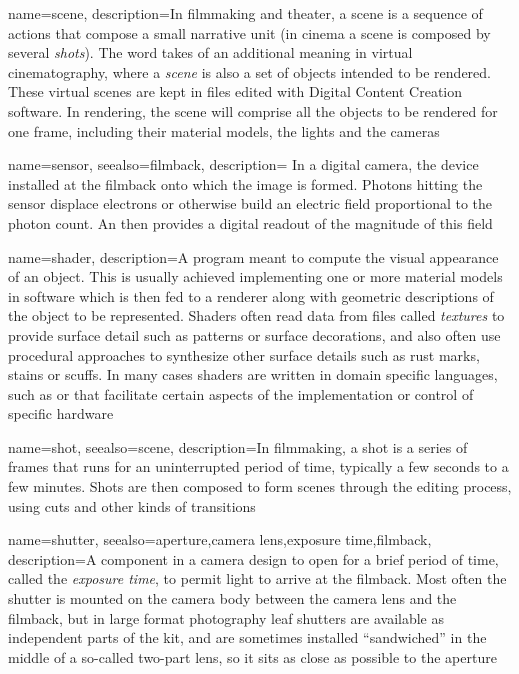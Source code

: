 {
    name={scene},
	description={In filmmaking and theater, a scene is a sequence of actions that compose
		a small narrative unit (in cinema a scene is composed by several 
		\textsl{shots}). 
		The word takes of an additional meaning in virtual cinematography, 
		where a \textsl{scene} is also a set of objects intended to be rendered.
		These virtual scenes are kept in files edited with 
		Digital Content Creation software.
		In rendering, the scene will comprise all the objects to be rendered for one frame,
		including their material models, the lights and the cameras}
}

{
	name=sensor,
	seealso={filmback},
	description={
		In a digital camera, the device installed at the filmback onto which the image is 
		formed. Photons hitting the sensor displace electrons or otherwise build an electric
		field proportional to the photon count. An  then provides a 
		digital readout of the magnitude of this field}
}

{
	name={shader},
	description={A program meant to compute the visual appearance of an object. 
		This is usually achieved implementing one or more material models in 
		software which is then fed to a renderer along with geometric descriptions
		of the object to be represented.
		Shaders often read data from files called \textsl{textures} to provide 
		surface detail such as patterns or surface decorations, 
		and also often use procedural approaches to synthesize other surface
		details such as rust marks, stains or scuffs.
		In many cases shaders are written in domain specific languages, such as 
		 or  that facilitate certain aspects of the 
		implementation or control of specific hardware}
}

{
	name={shot},
	seealso={scene},
	description={In filmmaking, a shot is a series of frames that runs for an uninterrupted
		period of time, typically a few seconds to a few minutes. Shots are then composed
		to form scenes through the editing process, using cuts and other kinds of transitions}
}

{
	name={shutter},
	seealso={aperture,camera lens,exposure time,filmback},
	description={A component in a camera design to open for a brief period of time, called the 
		\textsl{exposure time}, to permit light to arrive at the filmback. 
		Most often the shutter is mounted on the camera body between the camera lens 
		and the filmback, but in large format photography leaf shutters are available as 
		independent parts of the kit, and are sometimes installed ``sandwiched'' in the
		middle of a so-called two-part lens, so it sits as close as possible to the
		aperture}
}

